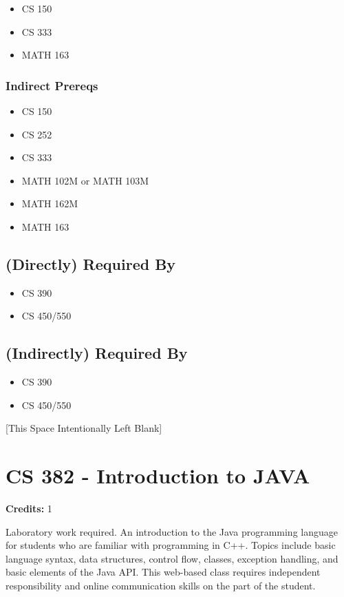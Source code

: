 \documentclass[]{article}
\providecommand{\tightlist}{%
  \setlength{\itemsep}{0pt}\setlength{\parskip}{0pt}}
\newcommand{\pagebreakhere}{
\vspace*{\fill}
\begin{center}
[This Space Intentionally Left Blank]
\end{center}
\vspace*{\fill}
\newpage
}
\begin{document}
\begin{itemize}
\tightlist
\item
  CS 150
\item
  CS 333
\item
  MATH 163
\end{itemize}

\subsubsection{Indirect Prereqs}\label{indirect-prereqs-15}

\begin{itemize}
\tightlist
\item
  CS 150
\item
  CS 252
\item
  CS 333
\item
  MATH 102M or MATH 103M
\item
  MATH 162M
\item
  MATH 163
\end{itemize}

\subsection{(Directly) Required By}\label{directly-required-by-11}

\begin{itemize}
\tightlist
\item
  CS 390
\item
  CS 450/550
\end{itemize}

\subsection{(Indirectly) Required By}\label{indirectly-required-by-11}

\begin{itemize}
\tightlist
\item
  CS 390
\item
  CS 450/550
\end{itemize}

\pagebreakhere
\section{CS 382 - Introduction to
JAVA}\label{cs-382---introduction-to-java}

\textbf{Credits:} 1

Laboratory work required. An introduction to the Java programming
language for students who are familiar with programming in C++. Topics
include basic language syntax, data structures, control flow, classes,
exception handling, and basic elements of the Java API. This web-based
class requires independent responsibility and online communication
skills on the part of the student.
\end{document}
